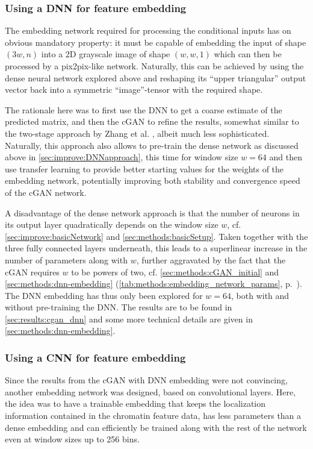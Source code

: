 \subsubsection{Using a DNN for feature embedding} \label{sec:improve:DNN_embedding}
The embedding network required for processing the conditional inputs
has on obvious mandatory property: it must be capable of embedding the input of shape $(3w,n)$ 
into a 2D grayscale image of shape $(w,w,1)$ which can then be processed by a pix2pix-like network.
Naturally, this can be achieved by using the dense neural network explored above
and reshaping its ``upper triangular'' output vector back into a symmetric ``image''-tensor with the required shape.

The rationale here was to first use the DNN to get a coarse estimate of the predicted matrix,
and then the cGAN to refine the results, somewhat similar to the two-stage approach by Zhang et al. \cite{Zhang2019c},
albeit much less sophisticated. 
Naturally, this approach also allows to pre-train the dense network as discussed above in \cref{sec:improve:DNNapproach}, 
this time for window size $w=64$ and then use transfer learning to provide better starting values for the weights of the embedding network, 
potentially improving both stability and convergence speed of the cGAN network.

A disadvantage of the dense network approach is that the number of neurons in its output layer quadratically depends on the window size $w$,
cf. \cref{sec:improve:basicNetwork} and \ref{sec:methods:basicSetup}.
Taken together with the three fully connected layers underneath, this leads to a superlinear increase in the number of parameters along with $w$,
further aggravated by the fact that the cGAN requires $w$ to be powers of two, cf. \cref{sec:methods:cGAN_initial} and  
\ref{sec:methods:dnn-embedding} (\cref{tab:methods:embedding_network_params}, p.~\pageref{tab:methods:embedding_network_params}).
The DNN embedding has thus only been explored for $w=64$, both with and without pre-training the DNN. 
The results are to be found in \cref{sec:results:cgan_dnn} and some more technical details are given in \cref{sec:methods:dnn-embedding}.

\subsubsection{Using a CNN for feature embedding} \label{sec:improve:CNN_embedding}
Since the results from the cGAN with DNN embedding were not convincing, another embedding network was designed, based on convolutional layers.
Here, the idea was to have a trainable embedding that keeps the localization information contained in the chromatin feature data,
has less parameters than a dense embedding and can efficiently be trained along with the rest of the network even at window sizes up to 256 bins.


